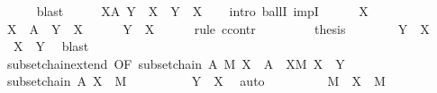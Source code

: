 \begin{isabellebody}
\ \ \ \ \isamarkupfalse%
\ blast\isanewline
\ \ \isamarkupfalse%
\ \isamarkupfalse%
\ {\isachardoublequoteopen}{\isasymforall}X{\isasymin}A{\isachardot}{\kern0pt}\ Y\ {\isasymsubseteq}\ X\ {\isasymlongrightarrow}\ Y\ {\isacharequal}{\kern0pt}\ X{\isachardoublequoteclose}\isanewline
\ \ \isamarkupfalse%
\ {\isacharparenleft}{\kern0pt}intro\ ballI\ impI{\isacharparenright}{\kern0pt}\isanewline
\ \ \ \ \isamarkupfalse%
\ X\isanewline
\ \ \ \ \isamarkupfalse%
\ {\isachardoublequoteopen}X\ {\isasymin}\ A{\isachardoublequoteclose}\ \ {\isachardoublequoteopen}Y\ {\isasymsubseteq}\ X{\isachardoublequoteclose}\isanewline
\ \ \ \ \isamarkupfalse%
\ {\isachardoublequoteopen}Y\ {\isacharequal}{\kern0pt}\ X{\isachardoublequoteclose}\isanewline
\ \ \ \ \isamarkupfalse%
\ {\isacharparenleft}{\kern0pt}rule\ ccontr{\isacharparenright}{\kern0pt}\isanewline
\ \ \ \ \ \ \isamarkupfalse%
\ {\isachardoublequoteopen}{\isasymnot}\ {\isacharquery}{\kern0pt}thesis{\isachardoublequoteclose}\isanewline
\ \ \ \ \ \ \isamarkupfalse%
\ {\isacartoucheopen}Y\ {\isasymsubseteq}\ X{\isacartoucheclose}\ \isamarkupfalse%
\ {\isachardoublequoteopen}{\isasymnot}\ X\ {\isasymsubseteq}\ Y{\isachardoublequoteclose}\ \isamarkupfalse%
\ blast\isanewline
\ \ \ \ \ \ \isamarkupfalse%
\ subset{\isachardot}{\kern0pt}chain{\isacharunderscore}{\kern0pt}extend\ {\isacharbrackleft}{\kern0pt}OF\ {\isacartoucheopen}subset{\isachardot}{\kern0pt}chain\ A\ M{\isacartoucheclose}\ {\isacartoucheopen}X\ {\isasymin}\ A{\isacartoucheclose}{\isacharbrackright}{\kern0pt}\ \ {\isacartoucheopen}{\isasymforall}X{\isasymin}M{\isachardot}{\kern0pt}\ X\ {\isasymsubseteq}\ Y{\isacartoucheclose}\isanewline
\ \ \ \ \ \ \isamarkupfalse%
\ {\isachardoublequoteopen}subset{\isachardot}{\kern0pt}chain\ A\ {\isacharparenleft}{\kern0pt}{\isacharbraceleft}{\kern0pt}X{\isacharbraceright}{\kern0pt}\ {\isasymunion}\ M{\isacharparenright}{\kern0pt}{\isachardoublequoteclose}\isanewline
\ \ \ \ \ \ \ \ \isamarkupfalse%
\ {\isacartoucheopen}Y\ {\isasymsubseteq}\ X{\isacartoucheclose}\ \isamarkupfalse%
\ auto\isanewline
\ \ \ \ \ \ \isamarkupfalse%
\ \isamarkupfalse%
\ {\isachardoublequoteopen}M\ {\isasymsubset}\ {\isacharbraceleft}{\kern0pt}X{\isacharbraceright}{\kern0pt}\ {\isasymunion}\ M{\isachardoublequoteclose}\isanewline

\end{isabellebody}
